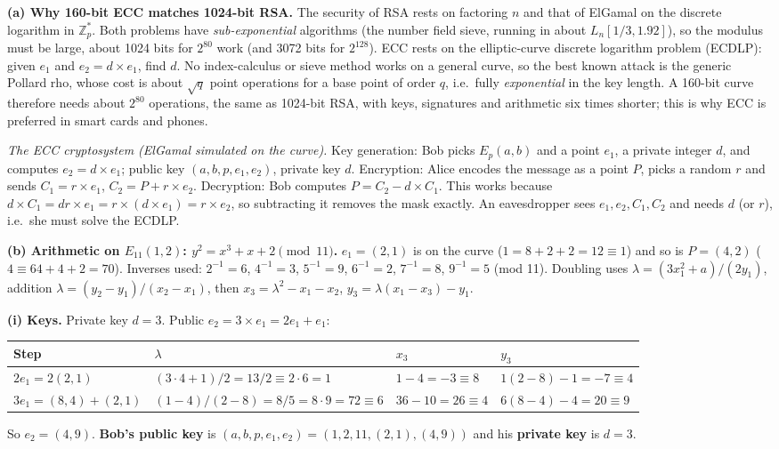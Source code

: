 \textbf{(a) Why 160-bit ECC matches 1024-bit RSA.} The security of RSA rests on factoring $n$ and that of ElGamal on the discrete logarithm in $\mathbb{Z}_p^*$. Both problems have \emph{sub-exponential} algorithms (the number field sieve, running in about $L_n[1/3, 1.92]$), so the modulus must be large, about 1024 bits for $2^{80}$ work (and 3072 bits for $2^{128}$). ECC rests on the elliptic-curve discrete logarithm problem (ECDLP): given $e_1$ and $e_2 = d \times e_1$, find $d$. No index-calculus or sieve method works on a general curve, so the best known attack is the generic Pollard rho, whose cost is about $\sqrt{q}$ point operations for a base point of order $q$, i.e.\ fully \emph{exponential} in the key length. A 160-bit curve therefore needs about $2^{80}$ operations, the same as 1024-bit RSA, with keys, signatures and arithmetic six times shorter; this is why ECC is preferred in smart cards and phones.

\emph{The ECC cryptosystem (ElGamal simulated on the curve).} Key generation: Bob picks $E_p(a, b)$ and a point $e_1$, a private integer $d$, and computes $e_2 = d \times e_1$; public key $(a, b, p, e_1, e_2)$, private key $d$. Encryption: Alice encodes the message as a point $P$, picks a random $r$ and sends $C_1 = r \times e_1$, $C_2 = P + r \times e_2$. Decryption: Bob computes $P = C_2 - d \times C_1$. This works because $d \times C_1 = d r \times e_1 = r \times (d \times e_1) = r \times e_2$, so subtracting it removes the mask exactly. An eavesdropper sees $e_1, e_2, C_1, C_2$ and needs $d$ (or $r$), i.e.\ she must solve the ECDLP.

\textbf{(b) Arithmetic on $E_{11}(1, 2)$: $y^2 = x^3 + x + 2 \pmod{11}$.} $e_1 = (2, 1)$ is on the curve ($1 = 8 + 2 + 2 = 12 \equiv 1$) and so is $P = (4, 2)$ ($4 \equiv 64 + 4 + 2 = 70$). Inverses used: $2^{-1} = 6$, $4^{-1} = 3$, $5^{-1} = 9$, $6^{-1} = 2$, $7^{-1} = 8$, $9^{-1} = 5$ (mod 11). Doubling uses $\lambda = (3x_1^2 + a)/(2y_1)$, addition $\lambda = (y_2 - y_1)/(x_2 - x_1)$, then $x_3 = \lambda^2 - x_1 - x_2$, $y_3 = \lambda(x_1 - x_3) - y_1$.

\textbf{(i) Keys.} Private key $d = 3$. Public $e_2 = 3 \times e_1 = 2e_1 + e_1$:
\begin{center}\small
\begin{tabular}{@{}llll@{}}
\toprule
Step & $\lambda$ & $x_3$ & $y_3$\\
\midrule
$2e_1 = 2(2, 1)$ & $(3 \cdot 4 + 1)/2 = 13/2 \equiv 2 \cdot 6 = 1$ & $1 - 4 = -3 \equiv 8$ & $1(2 - 8) - 1 = -7 \equiv 4$\\
$3e_1 = (8, 4) + (2, 1)$ & $(1 - 4)/(2 - 8) = 8/5 = 8 \cdot 9 = 72 \equiv 6$ & $36 - 10 = 26 \equiv 4$ & $6(8 - 4) - 4 = 20 \equiv 9$\\
\bottomrule
\end{tabular}
\end{center}
So $e_2 = (4, 9)$. \textbf{Bob's public key} is $(a, b, p, e_1, e_2) = (1, 2, 11, (2, 1), (4, 9))$ and his \textbf{private key} is $d = 3$.


